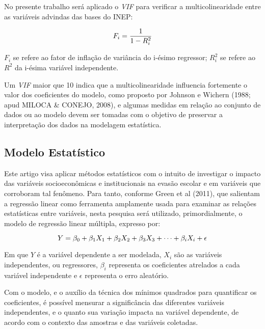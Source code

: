 \documentclass[english, spanish, brazilian]{RBIEarticle} %
\begin{document}
No presente trabalho será aplicado o \textit{VIF} para verificar a multicolinearidade entre as variáveis advindas das bases do INEP:

\vspace{0.5cm}
\begin{equation}
\large F_i = \frac{1}{1-R_i^2}
\end{equation}
\vspace{0.5cm}


$F_i$ se refere ao fator de inflação de variância do i-ésimo regressor; $R_i^2$ se refere ao $R^2$ da i-ésima variável independente.

Um \textit{VIF} maior que 10 indica que a multicolinearidade influencia fortemente o valor dos coeficientes do modelo, como proposto por Johnson e Wichern (1988; apud MILOCA \& CONEJO, 2008), e algumas medidas em relação ao conjunto de dados ou ao modelo devem ser tomadas com o objetivo de preservar a interpretação dos dados na modelagem estatística.

\subsection{Modelo Estatístico}
Este artigo visa aplicar métodos estatísticos com o intuito de investigar o impacto das variáveis socioeconômicas e institucionais na evasão escolar e em variáveis que corroboram tal fenômeno. Para tanto, conforme Green et al (2011), que salientam a regressão linear como ferramenta amplamente usada para examinar as relações estatísticas entre variáveis, nesta pesquisa será utilizado, primordialmente, o modelo de regressão linear múltipla, expresso por:

\vspace{0.5cm}
\begin{equation}
\large Y = \beta_0 + \beta_1X_1 + \beta_2X_2 + \beta_3X_3 + \cdots + \beta_iX_i + \epsilon 
\end{equation}
\vspace{0.5cm}

Em que $Y$ é a variável dependente a ser modelada, $X_i$ são as variáveis independentes, ou regressores, $\beta_i$ representa os coeficientes atrelados a cada variável independente e $\epsilon$ representa o erro aleatório. 

Com o modelo, e o auxílio da técnica dos mínimos quadrados para quantificar os coeficientes, é possível mensurar a significância das diferentes variáveis independentes, e o quanto sua variação impacta na variável dependente, de acordo com o contexto das amostras e das variáveis coletadas.
\end{document}

